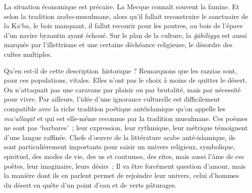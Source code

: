 La situation économique est précaire. La Mecque connaît souvent la
famine. Et selon la tradition arabo-musulmane, alors qu'il fallait
reconstruire le sanctuaire de la Ka`ba, le bois manquant, il fallut
recourir pour les poutres, au bois de l'épave d'un navire byzantin ayant
échoué.
Sur le plan de la culture, la \emph{ǧāhiliyya} est aussi marquée par
l'illettrisme et une certaine déchéance religieuse, le désordre des
cultes multiples.

Qu'en est-il de cette description~historique ? Remarquons que les
razzias sont, pour ces populations, vitales. Elles n'ont pas le choix à
moins de quitter le désert. On n'attaquait pas une caravane par plaisir
ou par brutalité, mais par nécessité pour vivre. Par ailleurs, l'idée
d'une ignorance culturelle est difficilement compatible avec la riche
tradition poétique antéislamique qu'on appelle les
\emph{mu`allaqāt} et qui est elle-même reconnue par la tradition
musulmane. Ces poèmes ne sont pas `barbares'~; leur expression, leur
rythmique, leur métrique témoignent d'une langue raffinée. Chefs d'œuvre
de la littérature arabe anté-islamique, ils sont particulièrement
importants pour saisir un univers religieux, symbolique, spirituel, des
modes de vie, des us et coutumes, des rites, mais aussi l'âme de ces
poètes, leur imaginaire, leurs désirs~; Il va être forcément question
d'amour, mais la manière dont ils en parlent permet de rejoindre leur
univers, celui d'hommes du désert en quête d'un point d'eau et de verts
pâturages.



